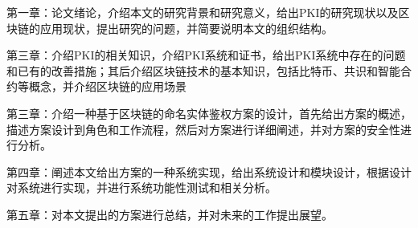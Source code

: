 
第一章：论文绪论，介绍本文的研究背景和研究意义，给出PKI的研究现状以及区块链的应用现状，提出研究的问题，并简要说明本文的组织结构。

第三章：介绍PKI的相关知识，介绍PKI系统和证书，给出PKI系统中存在的问题和已有的改善措施；其后介绍区块链技术的基本知识，包括比特币、共识和智能合约等概念，并介绍区块链的应用场景

第三章：介绍一种基于区块链的命名实体鉴权方案的设计，首先给出方案的概述，描述方案设计到角色和工作流程，然后对方案进行详细阐述，并对方案的安全性进行分析。

第四章：阐述本文给出方案的一种系统实现，给出系统设计和模块设计，根据设计对系统进行实现，并进行系统功能性测试和相关分析。

第五章：对本文提出的方案进行总结，并对未来的工作提出展望。




